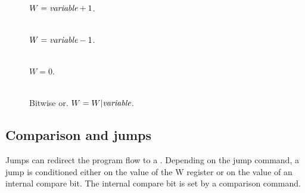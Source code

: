 \documentclass[11pt]{scrartcl}
\begin{document}
\begin{addmargin}{1cm}
\begin{description}
\item[ ]  \hfill\\
$  W = \text{{\it variable}} + 1$.

\item[ ]  \hfill\\  
$W = \text{{\it variable}} - 1 $.

\item[]  \hfill\\  
$W = 0$.

\item[ ]\hfill\\  
Bitwise or. $ W = W | \text{\it variable}$.
\end{description}
\end{addmargin}

\subsection{Comparison and jumps}
Jumps can redirect the program flow to a . Depending on the jump command, a jump is conditioned either on the value of the W register or on the value of an internal compare bit. The internal compare bit is set by a comparison command.
\end{document}
